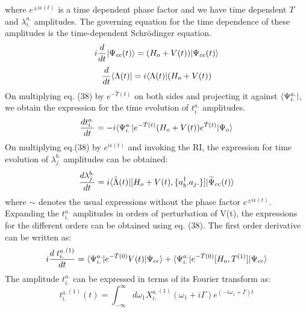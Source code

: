 where $e^{\pm i\epsilon(t)}$ is a time dependent phase factor
and we have time dependent $T$ and $\lambda^{a.}_{i.}$ amplitudes. The governing equation for 
the time dependence of these amplitudes is the time-dependent Schr\"odinger equation.
\begin{equation}
i\frac{d}{dt}| \Psi_{cc}(t) \rangle = (H_o + V(t))| \Psi_{cc}(t) \rangle 
\end{equation}
\begin{equation}
\frac{d}{dt}\langle \Lambda(t) | = i\langle \Lambda(t) |(H_o + V(t))
\end{equation}
On multiplying eq. (38) by $e^{-\hat{T}(t)}$ on both sides and projecting 
it against $\langle \Psi^{a.}_{i.} |$, we obtain the expression for the time evolution 
of $t^{a.}_{i.}$ amplitudes.
\begin{equation}
\frac{dt^{a.}_{i.}}{dt} = -i\langle \Psi^{a.}_{i.} |e^{-\hat{T}(t)}(H_o + V(t))e^{\hat{T}(t)}| \Psi_o \rangle
\end{equation}
On multiplying eq.(38) by $e^{i\epsilon(t)}$ and invoking the RI, the expression for 
time evolution of $\lambda^{b.}_{j.}$ amplitudes can be obtained:
\begin{equation}
\frac{d\lambda^{b.}_{j.}}{dt} =
i\langle {\tilde{\Lambda}}(t) |\lbrack H_o + V(t),\{{a}^\dagger_b.
a_j.\}\rbrack| {\widetilde{\Psi}_{cc}}(t) \rangle
\end{equation} 
where $\sim$ denotes the usual expressions without the phase factor $e^{\pm i\epsilon(t)}$. 
Expanding the $t^{a.}_{i.}$ amplitudes in orders of perturbation of V(t), the 
expressions for the different orders can be obtained using eq. (38). The first order
derivative can be written as:
\begin{equation}
i\frac{d\;{t^{a.}_{i.}}^{(1)}}{dt} = \langle \Psi^{a.}_{i.} |e^{-\hat{T}(0)}V(t)| \Psi_{cc} \rangle + \langle \Psi^{a.}_{i.} |e^{-\hat{T}(0)}\lbrack H_o,T^{(1)}\rbrack| \Psi_{cc} \rangle
\end{equation}
The amplitude $t^{a.}_{i.}$ can be expressed in terms of its Fourier transform as: 
\begin{equation}
{t^{a.}_{i.}}^{(1)}(t) = \int_{-\infty}^{\infty} d\omega_1{X^{a.}_{i.}}^{(1)}(\omega_1 + i\Gamma)e^{(-i\omega_1 + \Gamma) t}
\end{equation}

